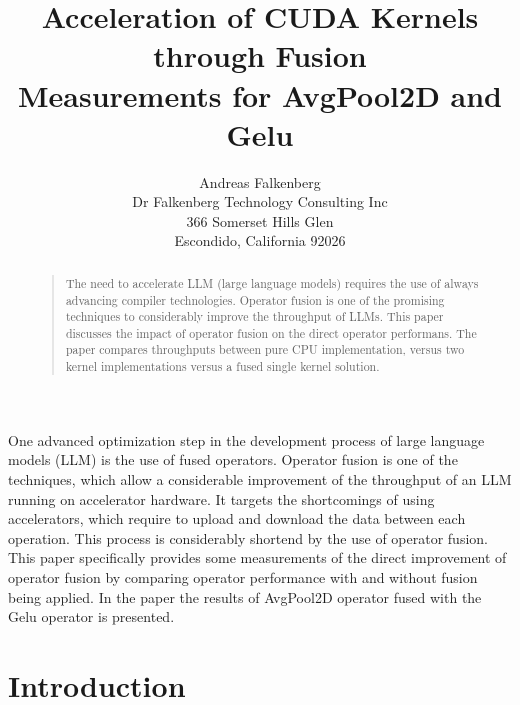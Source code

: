 \documentclass[letterpaper]{article}
\begin{document}
\title{Acceleration of CUDA Kernels through Fusion \\ Measurements for AvgPool2D and Gelu}
\author{Andreas Falkenberg\\
Dr Falkenberg Technology Consulting Inc\\
366 Somerset Hills Glen\\
Escondido, California 92026\\
}

\maketitle

\begin{abstract}
\begin{quote}
The need to accelerate LLM (large language models) requires the use of always advancing compiler technologies. Operator fusion is one of the promising techniques to considerably improve the throughput of LLMs. This paper discusses the impact of operator fusion on the direct operator performans. The paper compares throughputs between pure CPU implementation, versus two kernel implementations versus a fused single kernel solution.  

\end{quote}
\end{abstract}

\noindent

One advanced optimization step in the development process of large language models (LLM) is the use of fused operators. Operator fusion is one of the techniques, which allow a considerable improvement of the throughput of an LLM running on accelerator hardware. It targets the shortcomings of using accelerators, which require to upload and download the data between each operation. This process is considerably shortend by the use of operator fusion. This paper specifically provides some measurements of the direct improvement of operator fusion by comparing operator performance with and without fusion being applied. In the paper the results of AvgPool2D operator fused with the Gelu operator is presented.


\section{Introduction}
\end{document}
